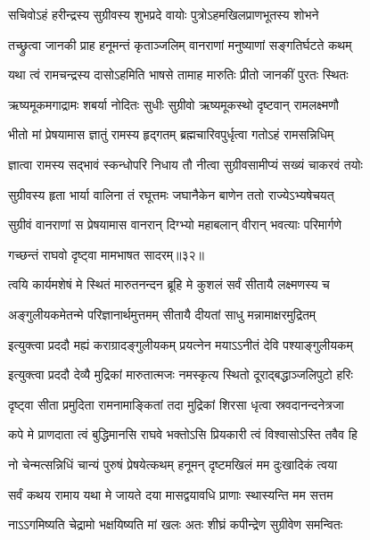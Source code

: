 \twolineshloka
{सचिवोऽहं हरीन्द्रस्य सुग्रीवस्य शुभप्रदे}
{वायोः पुत्रोऽहमखिलप्राणभूतस्य शोभने} %

\twolineshloka
{तच्छ्रुत्वा जानकी प्राह हनूमन्तं कृताञ्जलिम्}
{वानराणां मनुष्याणां सङ्गतिर्घटते कथम्} %

\twolineshloka
{यथा त्वं रामचन्द्रस्य दासोऽहमिति भाषसे}
{तामाह मारुतिः प्रीतो जानकीं पुरतः स्थितः} %

\twolineshloka
{ऋष्यमूकमगाद्रामः शबर्या नोदितः सुधीः}
{सुग्रीवो ऋष्यमूकस्थो दृष्टवान् रामलक्ष्मणौ} %

\twolineshloka
{भीतो मां प्रेषयामास ज्ञातुं रामस्य हृद्गतम्}
{ब्रह्मचारिवपुर्धृत्वा गतोऽहं रामसन्निधिम्} %

\twolineshloka
{ज्ञात्वा रामस्य सद्भावं स्कन्धोपरि निधाय तौ}
{नीत्वा सुग्रीवसामीप्यं सख्यं चाकरवं तयोः} %

\twolineshloka
{सुग्रीवस्य हृता भार्या वालिना तं रघूत्तमः}
{जघानैकेन बाणेन ततो राज्येऽभ्यषेचयत्} %

\twolineshloka
{सुग्रीवं वानराणां स प्रेषयामास वानरान्}
{दिग्भ्यो महाबलान् वीरान् भवत्याः परिमार्गणे} %

{गच्छन्तं राघवो दृष्ट्वा मामभाषत सादरम्॥३२॥} %


\twolineshloka
{त्वयि कार्यमशेषं मे स्थितं मारुतनन्दन}
{ब्रूहि मे कुशलं सर्वं सीतायै लक्ष्मणस्य च} %

\twolineshloka
{अङ्गुलीयकमेतन्मे परिज्ञानार्थमुत्तमम्}
{सीतायै दीयतां साधु मन्नामाक्षरमुद्रितम्} %

\twolineshloka
{इत्युक्त्वा प्रददौ मह्यं कराग्रादङ्गुलीयकम्}
{प्रयत्नेन मयाऽऽनीतं देवि पश्याङ्गुलीयकम्} %

\twolineshloka
{इत्युक्त्वा प्रददौ देव्यै मुद्रिकां मारुतात्मजः}
{नमस्कृत्य स्थितो दूराद्बद्धाञ्जलिपुटो हरिः} %

\twolineshloka
{दृष्ट्वा सीता प्रमुदिता रामनामाङ्कितां तदा}
{मुद्रिकां शिरसा धृत्वा स्रवदानन्दनेत्रजा} %

\twolineshloka
{कपे मे प्राणदाता त्वं बुद्धिमानसि राघवे}
{भक्तोऽसि प्रियकारी त्वं विश्वासोऽस्ति तवैव हि} %

\twolineshloka
{नो चेन्मत्सन्निधिं चान्यं पुरुषं प्रेषयेत्कथम्}
{हनूमन् दृष्टमखिलं मम दुःखादिकं त्वया} %

\twolineshloka
{सर्वं कथय रामाय यथा मे जायते दया}
{मासद्वयावधि प्राणाः स्थास्यन्ति मम सत्तम} %

\twolineshloka
{नाऽऽगमिष्यति चेद्रामो भक्षयिष्यति मां खलः}
{अतः शीघ्रं कपीन्द्रेण सुग्रीवेण समन्वितः} %


